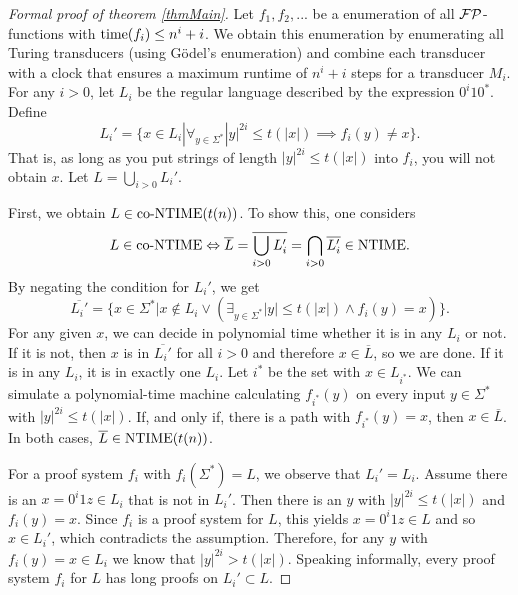   \begin{proof}[Formal proof of theorem \ref{thmMain}]
    Let \(f_1, f_2, ...\) be a enumeration of all \(\mathcal{FP}\)-functions with \(\operatorname{time}(f_i) \leq n^i + i\).
    We obtain this enumeration by enumerating all Turing transducers (using Gödel's enumeration) and combine each transducer with a clock that ensures a maximum runtime of \(n^i + i\) steps for a transducer \(M_i\).
    For any \(i > 0\), let \(L_i\) be the regular language described by the expression \(0^i10^*\). Define
      \[ L_i' = \{ x \in L_i | \forall_{ y \in \Sigma^* } |y|^{2i} \leq t(|x|) \implies f_i(y) \neq x \}. \]
    That is, as long as you put strings of length \(|y|^{2i} \leq t(|x|)\) into \(f_i\), you will not obtain \(x\).
    Let \(L = \bigcup_{i > 0} L_i'\).

    First, we obtain \(L \in \text{co-NTIME}(t(n))\). To show this, one considers
      \[L \in \text{co-NTIME} \Leftrightarrow \overline{L} = \overline{\bigcup_{i > 0} L_i'} = \bigcap_{i > 0} \overline{L_i'} \in \text{NTIME}.\]
    By negating the condition for \(L_i'\), we get
      \[ \overline{L_i'} = \{ x \in \Sigma^* | x \notin L_i \vee \left( \exists_{y \in \Sigma^*} |y| \leq t(|x|) \wedge f_i(y) = x \right) \}. \]
    For any given \(x\), we can decide in polynomial time whether it is in any \(L_i\) or not. If it is not, then \(x\) is in \(\overline{L_i'}\) for all \(i > 0\) and therefore \(x \in \overline{L}\), so we are done. If it is in any \(L_i\), it is in exactly one \(L_i\). Let \(i^*\) be the set with \(x \in L_{i^*}\). We can simulate  a polynomial-time machine calculating \(f_{i^*}(y)\) on every input \(y \in \Sigma^*\) with \(|y|^{2i} \leq t(|x|)\). If, and only if, there is a path with \(f_{i^*}(y) = x\), then \(x \in \overline{L}\). In both cases, \(\overline{L} \in \text{NTIME}(t(n))\).

    For a proof system \(f_i\) with \(f_i(\Sigma^*) = L\), we observe that \(L_i' = L_i\). Assume there is an \(x = 0^i1z \in L_i\) that is not in \(L_i'\). Then there is an \(y\) with \(|y|^{2i} \leq t(|x|)\) and \(f_i(y) = x\). Since \(f_i\) is a proof system for \(L\), this yields \(x = 0^i1z \in L\) and so \(x \in L_i'\), which contradicts the assumption. Therefore, for any \(y\) with \(f_i(y) = x \in L_i\) we know that \(|y|^{2i} > t(|x|)\). Speaking informally, every proof system \(f_i\) for \(L\) has long proofs on \(L_i' \subset L\).


\end{proof}
